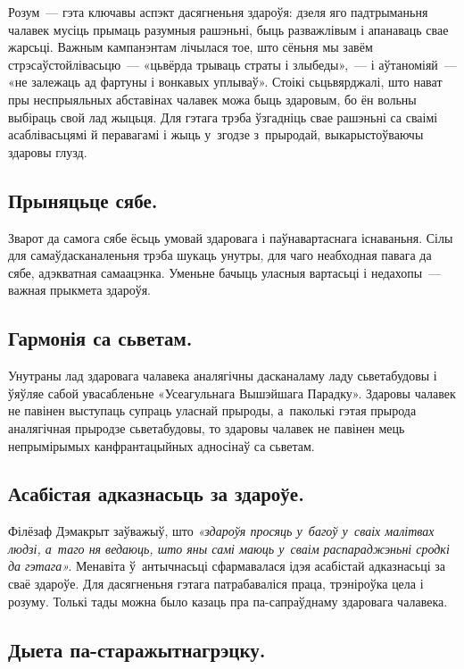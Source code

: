 Розум~--- гэта ключавы аспэкт дасягненьня здароўя: дзеля яго падтрыманьня чалавек мусіць прымаць разумныя рашэньні, быць разважлівым і апанаваць свае жарсьці. Важным кампанэнтам лічылася тое, што сёньня мы завём стрэсаўстойлівасьцю~--- «цьвёрда трываць страты і злыбеды»,~--- і аўтаноміяй~--- «не залежаць ад фартуны і вонкавых уплываў». Стоікі сьцьвярджалі, што нават пры неспрыяльных абставінах чалавек можа быць здаровым, бо ён вольны выбіраць свой лад жыцьця. Для гэтага трэба ўзгадніць свае рашэньні са сваімі асаблівасьцямі й перавагамі і жыць у~згодзе з~прыродай, выкарыстоўваючы здаровы глузд.

\subsection*{Прыняцьце сябе.} 

Зварот да самога сябе ёсьць умовай здаровага і паўнавартаснага існаваньня. Сілы для самаўдасканаленьня трэба шукаць унутры, для чаго неабходная павага да сябе, адэкватная самаацэнка. Уменьне бачыць уласныя вартасьці і недахопы~--- важная прыкмета здароўя.

\subsection*{Гармонія са сьветам.}

Унутраны лад здаровага чалавека аналягічны дасканаламу ладу сьветабудовы і ўяўляе сабой увасабленьне «Усеагульнага Вышэйшага Парадку». Здаровы чалавек не павінен выступаць супраць уласнай прыроды, а~паколькі гэтая прырода аналягічная прыродзе сьветабудовы, то здаровы чалавек не павінен мець непрымірымых канфрантацыйных адносінаў са сьветам.

\subsection*{Асабістая адказнасьць за здароўе.} 

Філёзаф Дэмакрыт заўважыў, што \emph{«здароўя просяць у~багоў у~сваіх малітвах людзі, а~таго ня ведаюць, што яны самі маюць у~сваім распараджэньні сродкі да гэтага».} Менавіта ў~антычнасьці сфармавалася ідэя асабістай адказнасьці за сваё здароўе. Для дасягненьня гэтага патрабаваліся праца, трэніроўка цела і розуму. Толькі тады можна было казаць пра па-сапраўднаму здаровага чалавека.

\subsection*{Дыета па-старажытнагрэцку.} 

